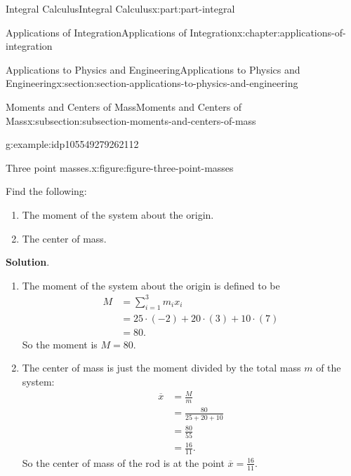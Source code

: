 \documentclass[twoside,10pt,]{book}
\newcommand{\blocktitlefont}{\relax}
\numberwithin{equation}{part}
\newcommand{\amp}{&}
\begin{document}
\begin{partptx}{Integral Calculus}{}{Integral Calculus}{}{}{x:part:part-integral}
\begin{chapterptx}{Applications of Integration}{}{Applications of Integration}{}{}{x:chapter:applications-of-integration}
\begin{sectionptx}{Applications to Physics and Engineering}{}{Applications to Physics and Engineering}{}{}{x:section:section-applications-to-physics-and-engineering}
\begin{subsectionptx}{Moments and Centers of Mass}{}{Moments and Centers of Mass}{}{}{x:subsection:subsection-moments-and-centers-of-mass}
\begin{example}{}{g:example:idp105549279262112}
\begin{figureptx}{Three point masses.}{x:figure:figure-three-point-masses}{}%
\begin{image}{0}{1}{0}%
%
\end{image}%
\tcblower
\end{figureptx}%
Find the following:%
\begin{enumerate}
\item{}The moment of the system about the origin.%
\item{}The center of mass.%
\end{enumerate}
%
\par\smallskip%
\noindent\textbf{\blocktitlefont Solution}.\hypertarget{g:solution:idp105549279265568}{}\quad{}%
\begin{enumerate}
\item{}The moment of the system about the origin is defined to be%
\begin{align*}
M \amp= \sum_{i=1}^{3}m_{i}x_{i}\\
\amp= 25\cdot(-2)+20\cdot(3)+10\cdot(7)\\
\amp= 80.
\end{align*}
So the moment is \(M = 80\).%
\item{}The center of mass is just the moment divided by the total mass \(m\) of the system:%
\begin{align*}
\overline{x}\amp= \frac{M}{m}\\
\amp= \frac{80}{25+20+10}\\
\amp= \frac{80}{55}\\
\amp= \frac{16}{11}.
\end{align*}
So the center of mass of the rod is at the point \(\overline{x} = \frac{16}{11}\).%
\end{enumerate}
\end{example}

\end{subsectionptx}
\end{sectionptx}
\end{chapterptx}
\end{partptx}
\end{document}

